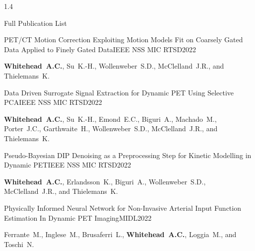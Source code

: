 \documentclass{cv}
\begin{document}
\begin{spacing}{1.4}
\begin{rSection}{Full Publication List}
            \vspace{-0.5cm}
            \item \begin{rSubsection}{PET/CT Motion Correction Exploiting Motion Models Fit on Coarsely Gated Data Applied to Finely Gated Data}{}{IEEE NSS MIC RTSD}{2022}
                \vspace{-0.25cm}
                \item \textbf{Whitehead~A.C.}, Su~K.-H., Wollenweber~S.D., McClelland~J.R., and Thielemans~K.
            \end{rSubsection}
    
            \vspace{-0.5cm}
            \item \begin{rSubsection}{Data Driven Surrogate Signal Extraction for Dynamic PET Using Selective PCA}{}{IEEE NSS MIC RTSD}{2022}
                \vspace{-0.25cm}
                \item \textbf{Whitehead~A.C.}, Su~K.-H., Emond~E.C., Biguri~A., Machado~M., Porter~J.C., Garthwaite~H., Wollenweber~S.D., McClelland~J.R., and Thielemans~K.
            \end{rSubsection}
    
            \vspace{-0.5cm}
            \item \begin{rSubsection}{Pseudo-Bayesian DIP Denoising as a Preprocessing Step for Kinetic Modelling in Dynamic \newline PET}{}{IEEE NSS MIC RTSD}{2022}
                \vspace{-0.25cm}
                \item \textbf{Whitehead~A.C.}, Erlandsson~K., Biguri~A., Wollenweber~S.D., McClelland~J.R., and Thielemans~K.
            \end{rSubsection}
    
            \vspace{-0.5cm}
            \item \begin{rSubsection}{Physically Informed Neural Network for Non-Invasive Arterial Input Function Estimation In Dynamic PET Imaging}{}{MIDL}{2022}
                \vspace{-0.25cm}
                \item Ferrante~M., Inglese~M., Brusaferri~L., \textbf{Whitehead~A.C.}, Loggia~M., and Toschi~N.
            \end{rSubsection}
    

\end{rSection}
\end{spacing}
\end{document}
